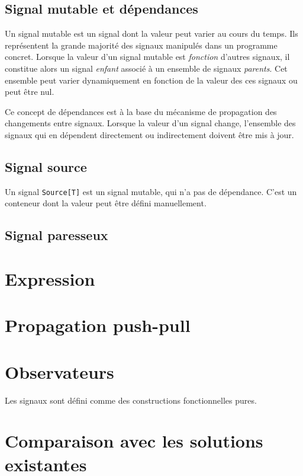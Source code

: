 	\subsection{Signal mutable et dépendances}
	
	Un signal mutable est un signal dont la valeur peut varier au cours du temps. Ils représentent la grande majorité des signaux manipulés dans un programme concret. Lorsque la valeur d'un signal mutable est \emph{fonction} d'autres signaux, il constitue alors un signal \emph{enfant} associé à un ensemble de signaux \emph{parents}. Cet ensemble peut varier dynamiquement en fonction de la valeur des ces signaux ou peut être nul.
	
	Ce concept de dépendances est à la base du mécanisme de propagation des changements entre signaux. Lorsque la valeur d'un signal change, l'ensemble des signaux qui en dépendent directement ou indirectement doivent être mis à jour.

	\subsection{Signal source}
	
	Un signal \texttt{Source[T]} est un signal mutable, qui n'a pas de dépendance. C'est un conteneur dont la valeur peut être défini manuellement.
	
	\subsection{Signal paresseux}

\section{Expression}

\section{Propagation push-pull}

\section{Observateurs} \label{sec:sig-obs}

Les signaux sont défini comme des constructions fonctionnelles pures.

\section{Comparaison avec les solutions existantes}
